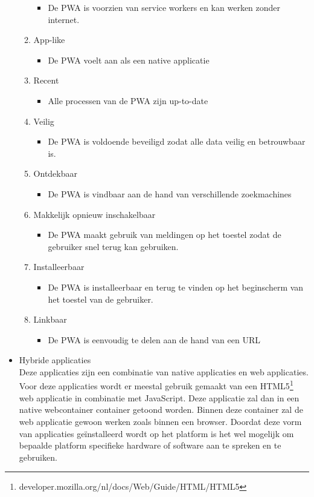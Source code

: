 \begin{itemize}
\begin{enumerate}
\begin{itemize}
           \item De PWA is voorzien van service workers en kan werken zonder internet.
       \end{itemize}
       \item App-like
       \begin{itemize}
           \item De PWA voelt aan als een native applicatie
       \end{itemize}
       \item Recent
       \begin{itemize}
           \item Alle processen van de PWA zijn up-to-date 
       \end{itemize}
       \item Veilig
       \begin{itemize}
           \item De PWA is voldoende beveiligd zodat alle data veilig en betrouwbaar is.
       \end{itemize}
       \item Ontdekbaar
       \begin{itemize}
           \item De PWA is vindbaar aan de hand van verschillende zoekmachines
       \end{itemize}
       \item Makkelijk opnieuw inschakelbaar
       \begin{itemize}
           \item De PWA maakt gebruik van meldingen op het toestel zodat de gebruiker snel terug kan gebruiken.
       \end{itemize}
       \item Installeerbaar
       \begin{itemize}
           \item De PWA is installeerbaar en terug te vinden op het beginscherm van het toestel van de gebruiker.
       \end{itemize}
       \item Linkbaar
       \begin{itemize}
           \item De PWA is eenvoudig te delen aan de hand van een URL
       \end{itemize}
    \end{enumerate} 

    \item Hybride applicaties\\
    Deze applicaties zijn een combinatie van native applicaties en web applicaties. Voor deze applicaties wordt er meestal gebruik gemaakt van een HTML5\footnote{developer.mozilla.org/nl/docs/Web/Guide/HTML/HTML5} web applicatie in combinatie met JavaScript. Deze applicatie zal dan in een native webcontainer container getoond worden. Binnen deze container zal de web applicatie gewoon werken zoals binnen een browser. Doordat deze vorm van applicaties geïnstalleerd wordt op het platform is het wel mogelijk om bepaalde platform specifieke hardware of software aan te spreken en te gebruiken.
    \\
    

\end{itemize}
